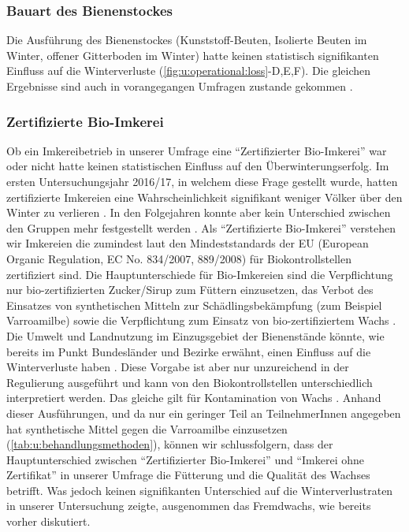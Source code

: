 \subsubsection{Bauart des Bienenstockes}

Die Ausführung des Bienenstockes (Kunststoff-Beuten, Isolierte Beuten im Winter, offener Gitterboden im Winter) hatte keinen statistisch signifikanten Einfluss auf die Winterverluste (\cref{fig:u:operational:loss}-D,E,F). Die gleichen Ergebnisse sind auch in vorangegangen Umfragen zustande gekommen \citep{crailsheim2018, oberreiter2020}.

\subsubsection{Zertifizierte Bio-Imkerei}

Ob ein Imkereibetrieb in unserer Umfrage eine \enquote{Zertifizierter Bio-Imkerei} war oder nicht hatte keinen statistischen Einfluss auf den Überwinterungserfolg. Im ersten Untersuchungsjahr 2016/17, in welchem diese Frage gestellt wurde, hatten zertifizierte Imkereien eine Wahrscheinlichkeit signifikant weniger Völker über den Winter zu verlieren \citep{crailsheim2018}. In den Folgejahren konnte aber kein Unterschied zwischen den Gruppen mehr festgestellt werden \citep{brodschneider2018a, oberreiter2020}.
\newline
Als \enquote{Zertifizierte Bio-Imkerei} verstehen wir Imkereien die zumindest laut den Mindeststandards der EU (European Organic Regulation, EC No. 834/2007, 889/2008) für Biokontrollstellen zertifiziert sind. Die Hauptunterschiede für Bio-Imkereien sind die Verpflichtung nur bio-zertifizierten Zucker/Sirup zum Füttern einzusetzen, das Verbot des Einsatzes von synthetischen Mitteln zur Schädlingsbekämpfung (zum Beispiel Varroamilbe) sowie die Verpflichtung zum Einsatz von bio-zertifiziertem Wachs \citep{thrasyvoulou2015}. Die Umwelt und Landnutzung im Einzugsgebiet der Bienenstände könnte, wie bereits im Punkt Bundesländer und Bezirke erwähnt, einen Einfluss auf die Winterverluste haben \citep{kuchling2018}. Diese Vorgabe ist aber nur unzureichend in der Regulierung ausgeführt und kann von den Biokontrollstellen unterschiedlich interpretiert werden. Das gleiche gilt für Kontamination von Wachs \citep{thrasyvoulou2015}.
\newline
Anhand dieser Ausführungen, und da nur ein geringer Teil an TeilnehmerInnen angegeben hat synthetische Mittel gegen die Varroamilbe einzusetzen (\cref{tab:u:behandlungsmethoden}), können wir schlussfolgern, dass der Hauptunterschied zwischen \enquote{Zertifizierter Bio-Imkerei} und \enquote{Imkerei ohne Zertifikat} in unserer Umfrage die Fütterung und die Qualität des Wachses betrifft. Was jedoch keinen signifikanten Unterschied auf die Winterverlustraten in unserer Untersuchung zeigte, ausgenommen das Fremdwachs, wie bereits vorher diskutiert.

